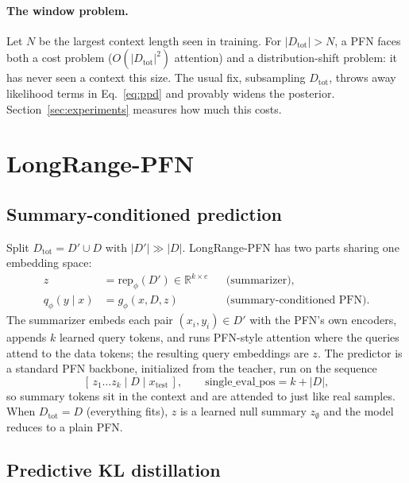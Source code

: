 \documentclass[11pt]{article}
\newcommand{\Dtot}{D_{\mathrm{tot}}}
\newcommand{\Dfar}{D'}
\newcommand{\Dloc}{D}
\newcommand{\rep}{\mathrm{rep}}
\begin{document}
\paragraph{The window problem.} Let $N$ be the largest context length seen
in training. For $|\Dtot| > N$, a PFN faces both a cost problem
($O(|\Dtot|^2)$ attention) and a distribution-shift problem: it has never
seen a context this size. The usual fix, subsampling $\Dtot$, throws away
likelihood terms in Eq.~\eqref{eq:ppd} and provably widens the posterior.
Section~\ref{sec:experiments} measures how much this costs.

\section{LongRange-PFN}
\label{sec:method}

\subsection{Summary-conditioned prediction}
\label{sec:summary}

Split $\Dtot = \Dfar \cup \Dloc$ with $|\Dfar| \gg |\Dloc|$. LongRange-PFN
has two parts sharing one embedding space:
\begin{align}
  z &= \rep_\phi(\Dfar) \in \mathbb{R}^{k \times e}
  &&\text{(summarizer)},\\
  q_\phi(y \mid x) &= g_\phi(x, \Dloc, z)
  &&\text{(summary-conditioned PFN)}.
\end{align}
The summarizer embeds each pair $(x_i, y_i) \in \Dfar$ with the PFN's own
encoders, appends $k$ learned query tokens, and runs PFN-style attention
where the queries attend to the data tokens; the resulting query embeddings
are $z$. The predictor is a standard PFN backbone, initialized from the
teacher, run on the sequence
\[
  [\, z_1 \dots z_k \mid \Dloc \mid x_{\mathrm{test}} \,],
  \qquad \text{single\_eval\_pos} = k + |\Dloc| ,
\]
so summary tokens sit in the context and are attended to just like real
samples. When $\Dtot = \Dloc$ (everything fits), $z$ is a learned null
summary $z_\emptyset$ and the model reduces to a plain PFN.

\subsection{Predictive KL distillation}
\label{sec:kl}
\end{document}
